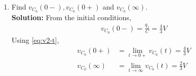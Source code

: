 \documentclass[journal,12pt,twocolumn]{IEEEtran}
\newcommand{\solution}{\noindent \textbf{Solution: }}
\numberwithin{equation}{section}
\renewcommand\thesection{\arabic{section}}
\begin{document}
\begin{enumerate}[label=\arabic*.,ref=\thesection.\theenumi]
	\item Find $v_{C_0}(0-), v_{C_0}(0+)$ and  $v_{C_0}(\infty) $.\\
\solution From the initial conditions,
\begin{align}
    v_{C_0}(0-) = \frac{q_1}{C} = {\frac{4}{3}}{V}
\end{align}
Using \eqref{eq:v2-t},
\begin{align}
    v_{C_0}(0+) &= \lim_{t \to 0+}v_{C_0}(t) = {\frac{4}{3}}{V} \\
    v_{C_0}(\infty) &= \lim_{t \to \infty}v_{C_0}(t) = {\frac{2}{3}}{V}
\end{align}


	\end{enumerate}
\end{document}
